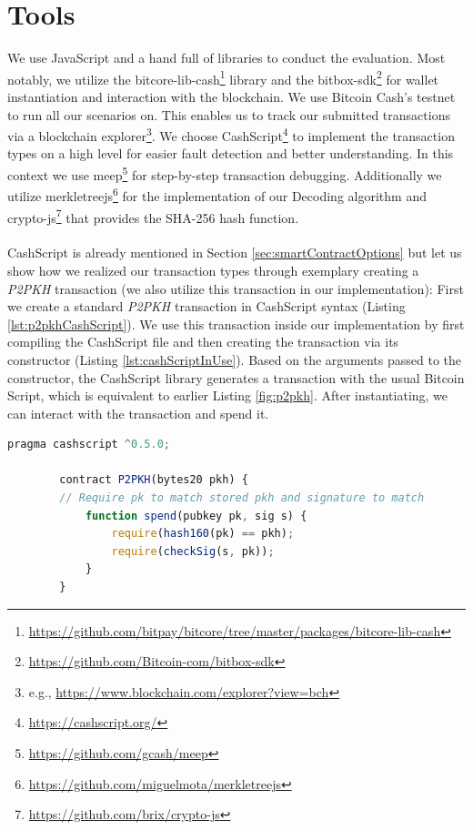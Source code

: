 \documentclass{cacthesis}
\begin{document}
	    \section{Tools}
        We use JavaScript and a hand full of libraries to conduct the evaluation. Most notably, we utilize the bitcore-lib-cash\footnote{\url{https://github.com/bitpay/bitcore/tree/master/packages/bitcore-lib-cash}} library and the bitbox-sdk\footnote{\url{https://github.com/Bitcoin-com/bitbox-sdk}} for wallet instantiation and interaction with the blockchain. We use Bitcoin Cash's testnet to run all our scenarios on. This enables us to track our submitted transactions via a blockchain explorer\footnote{e.g., \url{https://www.blockchain.com/explorer?view=bch}}. We choose CashScript\footnote{\url{https://cashscript.org/}} to implement the transaction types on a high level for easier fault detection and better understanding. In this context we use meep\footnote{\url{https://github.com/gcash/meep}} for step-by-step transaction debugging. Additionally we utilize merkletreejs\footnote{\url{https://github.com/miguelmota/merkletreejs}} for the implementation of our \textsf{Decoding} algorithm and crypto-js\footnote{\url{https://github.com/brix/crypto-js}} that provides the SHA-256 hash function. \\\\  
        CashScript is already mentioned in Section \ref{sec:smartContractOptions} but let us show how we realized our transaction types through exemplary creating a \textit{P2PKH} transaction (we also utilize this transaction in our implementation): First we create a standard \textit{P2PKH} transaction in CashScript syntax (Listing \ref{lst:p2pkhCashScript}). We use this transaction inside our implementation by first compiling the CashScript file and then creating the transaction via its constructor (Listing \ref{lst:cashScriptInUse}). Based on the arguments passed to the constructor, the CashScript library generates a transaction with the usual Bitcoin Script, which is equivalent to earlier Listing \ref{fig:p2pkh}. After instantiating, we can interact with the transaction and spend it.
	    
	    \begin{minipage}{\linewidth}
        \begin{lstlisting}[language=JavaScript, basicstyle=\footnotesize, caption= p2pkh.cash - Bitcoin \textit{P2PKH} in high-level CashScript, captionpos=b, backgroundcolor=\color{backcolour}, label=lst:p2pkhCashScript]
        pragma cashscript ^0.5.0;
        
        contract P2PKH(bytes20 pkh) {
        // Require pk to match stored pkh and signature to match
            function spend(pubkey pk, sig s) {
                require(hash160(pk) == pkh);
                require(checkSig(s, pk));
            }
        }
        \end{lstlisting}
        \end{minipage}
        
\end{document}
